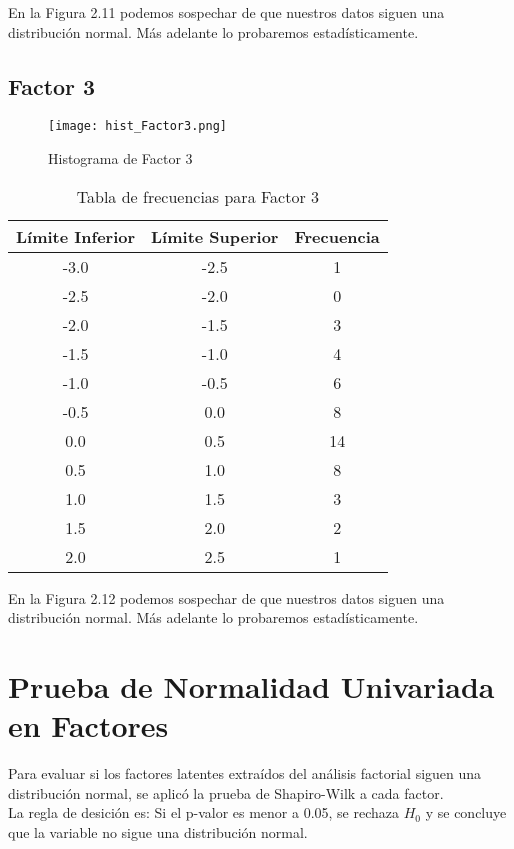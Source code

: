 \documentclass[12pt]{report}
\begin{document}
\noindent En la Figura 2.11 podemos sospechar de que nuestros datos siguen una distribución normal. Más adelante lo probaremos estadísticamente.

\subsection{Factor 3}
\begin{figure}[H]
    \centering
    \texttt{[image: hist\_Factor3.png]}
    \caption{Histograma de Factor 3}
\end{figure}

\begin{table}[H]
\centering
\begin{tabular}{|c|c|c|}
\hline
\textbf{Límite Inferior} & \textbf{Límite Superior} & \textbf{Frecuencia} \\
\hline
-3.0 & -2.5 & 1 \\
-2.5 & -2.0 & 0 \\
-2.0 & -1.5 & 3 \\
-1.5 & -1.0 & 4 \\
-1.0 & -0.5 & 6 \\
-0.5 &  0.0 & 8 \\
 0.0 &  0.5 & 14 \\
 0.5 &  1.0 & 8 \\
 1.0 &  1.5 & 3 \\
 1.5 &  2.0 & 2 \\
 2.0 &  2.5 & 1 \\
\hline
\end{tabular}
\caption{Tabla de frecuencias para Factor 3}
\end{table}

\noindent En la Figura 2.12 podemos sospechar de que nuestros datos siguen una distribución normal. Más adelante lo probaremos estadísticamente.

\newpage

\section{Prueba de Normalidad Univariada en Factores}

Para evaluar si los factores latentes extraídos del análisis factorial siguen una distribución normal, se aplicó la prueba de Shapiro-Wilk a cada factor.\\ La regla de desición es: Si el p-valor es menor a 0.05, se rechaza $H_0$ y se concluye que la variable no sigue una distribución normal.
\end{document}
